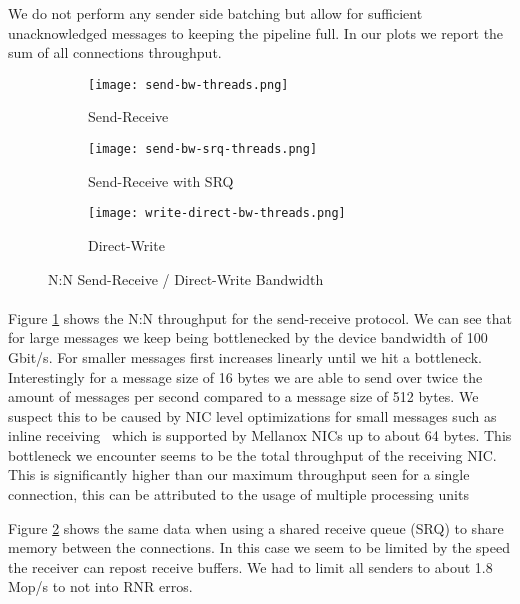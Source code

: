 We do not perform any sender side batching but allow for sufficient unacknowledged messages to keeping the pipeline full.
In our plots we report the sum of all connections throughput.

\begin{figure}[ht]
  \centering
\begin{subfigure}[b]{0.49\textwidth}
  \centering
  \texttt{[image: send-bw-threads.png]}
  \caption{Send-Receive}
  \label{fig:plot-sndrcv-bw-thread-nosrq}
\end{subfigure}
\begin{subfigure}[b]{0.49\textwidth}
  \centering
  \texttt{[image: send-bw-srq-threads.png]}
  \caption{Send-Receive with SRQ}
  \label{fig:plot-sndrcv-bw-thread-srq}
\end{subfigure}
  \begin{subfigure}[b]{0.48\textwidth}
  \centering
  \texttt{[image: write-direct-bw-threads.png]}
  \caption{Direct-Write}
  \label{fig:plot-wdir-bw-threads}
  \end{subfigure}
\caption{N:N Send-Receive / Direct-Write Bandwidth}
  \label{fig:plot-sndrcv-bw-thread}
\end{figure}


\paragraph{} Figure \ref{fig:plot-sndrcv-bw-thread-nosrq} shows the N:N throughput for the send-receive protocol.
We can see that for large messages we keep being bottlenecked by the device bandwidth of 100 Gbit/s. For smaller
messages first increases linearly until we hit a bottleneck. Interestingly for a message size of 16 bytes we are able to 
send over twice the amount of messages per second compared to a message size of 512 bytes. We suspect this to be caused by 
NIC level optimizations for small messages such as inline receiving~\cite{anuj-guide} which is supported by Mellanox NICs up 
to about 64 bytes. This bottleneck we encounter seems to be the total throughput of the receiving NIC. This is significantly 
higher than our maximum throughput seen for a single connection, this can be attributed to the usage of multiple processing 
units~\cite{anuj-guide}


Figure \ref{fig:plot-sndrcv-bw-thread-srq} shows the same data when using a shared receive queue (SRQ) to share memory
between the connections. In this case we seem to be limited by the speed the receiver can repost receive buffers. We
had to limit all senders to about 1.8 Mop/s to not into RNR erros.

